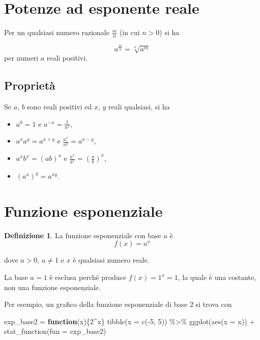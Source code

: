 \documentclass[
  11pt,
]{krantz}
\makeatletter
\newenvironment{Shaded}{\begin{snugshade}}{\end{snugshade}}
\newcommand{\AttributeTok}[1]{\textcolor[rgb]{0.61,0.61,0.61}{#1}}
\newcommand{\ControlFlowTok}[1]{\textcolor[rgb]{0.27,0.27,0.27}{\textbf{#1}}}
\newcommand{\DecValTok}[1]{\textcolor[rgb]{0.06,0.06,0.06}{#1}}
\newcommand{\FunctionTok}[1]{\textcolor[rgb]{0,0,0}{#1}}
\newcommand{\NormalTok}[1]{#1}
\newcommand{\OtherTok}[1]{\textcolor[rgb]{0.37,0.37,0.37}{#1}}
\newcommand{\SpecialCharTok}[1]{\textcolor[rgb]{0,0,0}{#1}}
\providecommand{\tightlist}{%
  \setlength{\itemsep}{0pt}\setlength{\parskip}{0pt}}
\newenvironment{kframe}{%
\medskip{}
\setlength{\fboxsep}{.8em}
 \def\at@end@of@kframe{}%
 \ifinner\ifhmode%
  \def\at@end@of@kframe{\end{minipage}}%
  \begin{minipage}{\columnwidth}%
 \fi\fi%
 \def\FrameCommand##1{\hskip\@totalleftmargin \hskip-\fboxsep
 \colorbox{shadecolor}{##1}\hskip-\fboxsep
     \hskip-\linewidth \hskip-\@totalleftmargin \hskip\columnwidth}%
 \MakeFramed {\advance\hsize-\width
   \@totalleftmargin\z@ \linewidth\hsize
   \@setminipage}}%
 {\par\unskip\endMakeFramed%
 \at@end@of@kframe}
\renewenvironment{Shaded}{\begin{kframe}}{\end{kframe}}
\theoremstyle{definition}
\newtheorem{definition}{Definizione}[chapter]
\theoremstyle{definition}
\theoremstyle{definition}
\theoremstyle{definition}
\theoremstyle{remark}
\makeatother
\begin{document}
\hypertarget{potenze-ad-esponente-reale}{%
\section*{Potenze ad esponente reale}\label{potenze-ad-esponente-reale}}


Per un qualsiasi numero razionale \(\frac{m}{n}\) (in cui \(n > 0\)) si ha

\[
a^{\frac{m}{n}} = \sqrt[n]{a^m}
\] per numeri \(a\) reali positivi.

\hypertarget{proprietuxe0}{%
\subsection*{Proprietà}\label{proprietuxe0}}


Se \(a\), \(b\) sono reali positivi ed \(x\), \(y\) reali qualsiasi, si ha

\begin{itemize}
\tightlist
\item
  \(a^0 = 1\) e \(a^{-x} = \frac{1}{a^x}\),
\item
  \(a^x a^y = a^{x+y}\) e \(\frac{a^x}{a^y} = a^{x-y}\),
\item
  \(a^x b^x = (ab)^{x}\) e \(\frac{a^x}{b^x} = \left(\frac{a}{b}\right)^x\),
\item
  \((a^x)^y = a^{xy}\).
\end{itemize}

\hypertarget{funzione-esponenziale}{%
\section{Funzione esponenziale}\label{funzione-esponenziale}}

\begin{definition}
La funzione esponenziale con base \(a\) è \begin{equation}
f(x) = a^x
\end{equation}

dove \(a > 0\), \(a \neq 1\) e \(x\) è qualsiasi numero reale.
\end{definition}

La base \(a = 1\) è esclusa perché produce \(f(x) = 1^x = 1\), la quale è una costante, non una funzione esponenziale.

Per esempio, un grafico della funzione esponenziale di base 2 si trova con

\begin{Shaded}
\begin{Highlighting}[]
\NormalTok{exp\_base2 }\OtherTok{=} \ControlFlowTok{function}\NormalTok{(x)\{}\DecValTok{2}\SpecialCharTok{\^{}}\NormalTok{x\}}
\FunctionTok{tibble}\NormalTok{(}\AttributeTok{x =} \FunctionTok{c}\NormalTok{(}\SpecialCharTok{{-}}\DecValTok{5}\NormalTok{, }\DecValTok{5}\NormalTok{)) }\SpecialCharTok{\%\textgreater{}\%}
\FunctionTok{ggplot}\NormalTok{(}\FunctionTok{aes}\NormalTok{(}\AttributeTok{x =}\NormalTok{ x)) }\SpecialCharTok{+}
  \FunctionTok{stat\_function}\NormalTok{(}\AttributeTok{fun =}\NormalTok{ exp\_base2)}
\end{Highlighting}
\end{Shaded}
\end{document}
